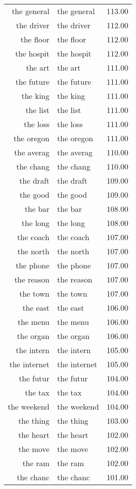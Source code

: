 \begin{table}[ht]
\begin{tabular}{rlr}
  the general & the general & 113.00 \\ 
  the driver & the driver & 112.00 \\ 
  the floor & the floor & 112.00 \\ 
  the hospit & the hospit & 112.00 \\ 
  the art & the art & 111.00 \\ 
  the future & the future & 111.00 \\ 
  the king & the king & 111.00 \\ 
  the list & the list & 111.00 \\ 
  the loss & the loss & 111.00 \\ 
  the oregon & the oregon & 111.00 \\ 
  the averag & the averag & 110.00 \\ 
  the chang & the chang & 110.00 \\ 
  the draft & the draft & 109.00 \\ 
  the good & the good & 109.00 \\ 
  the bar & the bar & 108.00 \\ 
  the long & the long & 108.00 \\ 
  the coach & the coach & 107.00 \\ 
  the north & the north & 107.00 \\ 
  the phone & the phone & 107.00 \\ 
  the reason & the reason & 107.00 \\ 
  the town & the town & 107.00 \\ 
  the east & the east & 106.00 \\ 
  the menu & the menu & 106.00 \\ 
  the organ & the organ & 106.00 \\ 
  the intern & the intern & 105.00 \\ 
  the internet & the internet & 105.00 \\ 
  the futur & the futur & 104.00 \\ 
  the tax & the tax & 104.00 \\ 
  the weekend & the weekend & 104.00 \\ 
  the thing & the thing & 103.00 \\ 
  the heart & the heart & 102.00 \\ 
  the move & the move & 102.00 \\ 
  the ram & the ram & 102.00 \\ 
  the chanc & the chanc & 101.00 \\ 

\end{tabular}
\end{table}
